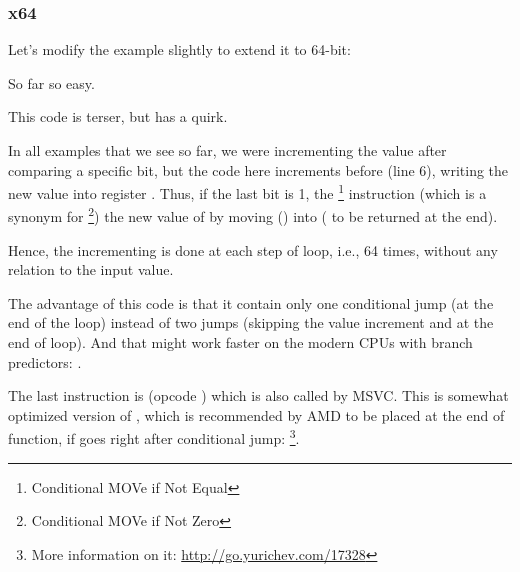 \subsubsection{x64}
\label{subsec:popcnt}

Let's modify the example slightly to extend it to 64-bit:




So far so easy.






This code is terser, but has a quirk.

In all examples that we see so far, we were incrementing the  value after comparing a specific bit,
but the code here increments  before (line 6), writing the new value into register \EDX .
Thus, if the last bit is 1, the \CMOVNE\footnote{Conditional MOVe if Not Equal} instruction
(which is a synonym for \CMOVNZ\footnote{Conditional MOVe if Not Zero})  
the new value of 
by moving \EDX () into \EAX ( to be returned at the end).

Hence, the incrementing is done at each step of loop, i.e., 64 times, without any relation to the input value.

The advantage of this code is that it contain only one conditional jump (at the end of the loop) instead of 
two jumps (skipping the  value increment and at the end of loop).
And that might work faster on the modern CPUs with branch predictors: .

\label{FATRET}
The last instruction is  (opcode ) 
which is also called  by MSVC.
This is somewhat optimized version of \RET, 
which is recommended by AMD to be placed at the end of function, if \RET goes right after conditional jump: 
\footnote{More information on it: \url{http://go.yurichev.com/17328}}.


